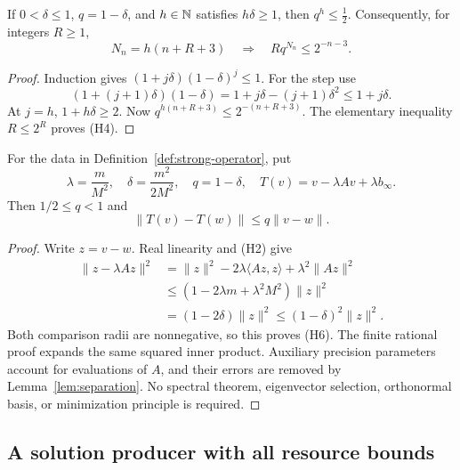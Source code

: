 \begin{lemma}
\label{lem:clock}
If \(0<\delta\leq1\), \(q=1-\delta\), and \(h\in\mathbb N\) satisfies \(h\delta\geq1\),
then \(q^h\leq\tfrac12\). Consequently, for integers \(R\geq1\),
\[
       N_n=h(n+R+3)\quad\Longrightarrow\quad
       Rq^{N_n}\leq2^{-n-3}.
 \tag{H4}
\]
\end{lemma}
\begin{proof}
Induction gives
\((1+j\delta)(1-\delta)^j\leq1\).
For the step use
\[
(1+(j+1)\delta)(1-\delta)
=1+j\delta-(j+1)\delta^2\leq1+j\delta.
\]
At \(j=h\), \(1+h\delta\geq2\).
Now \(q^{h(n+R+3)}\leq2^{-(n+R+3)}\).
The elementary inequality \(R\leq2^R\) proves (H4).
\end{proof}

\begin{lemma}
\label{lem:coercive-contraction}
For the data in Definition~\ref{def:strong-operator}, put
\[
 \lambda=\frac{m}{M^2},\quad
 \delta=\frac{m^2}{2M^2},\quad q=1-\delta,\quad
 T(v)=v-\lambda Av+\lambda b_\infty .
 \tag{H5}
\]
Then \(1/2\leq q<1\) and
\[
                     \|T(v)-T(w)\|\leq q\|v-w\|.
 \tag{H6}
\]
\end{lemma}
\begin{proof}
Write \(z=v-w\). Real linearity and (H2) give
\[
\begin{split}
\|z-\lambda Az\|^2
 &=\|z\|^2-2\lambda\langle Az,z\rangle+\lambda^2\|Az\|^2\\
 &\leq(1-2\lambda m+\lambda^2M^2)\|z\|^2\\
 &=(1-2\delta)\|z\|^2
 \leq(1-\delta)^2\|z\|^2 .
\end{split}
\]
Both comparison radii are nonnegative, so this proves (H6).
The finite rational proof expands the same squared inner product. Auxiliary
precision parameters account for evaluations of \(A\), and their errors are
removed by Lemma~\ref{lem:separation}. No spectral theorem, eigenvector
selection, orthonormal basis, or minimization principle is required.
\end{proof}

\subsection{A solution producer with all resource bounds}

